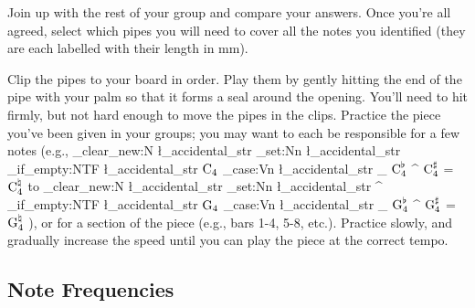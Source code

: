\documentclass{article}
\newcommand{\notename}[3][]{
    \str_clear_new:N \l_accidental_str%
    \str_set:Nn \l_accidental_str {#1}%
    \str_if_empty:NTF \l_accidental_str {
        \ensuremath{\text{#2}\sb{#3}}%
    }{
        \str_case:Vn \l_accidental_str {%
            {_} {\ensuremath{\text{#2}^{\flat}\sb{#3}}}%
            {^} {\ensuremath{\text{#2}^{\sharp}\sb{#3}}}%
            {=} {\ensuremath{\text{#2}^{\natural}\sb{#3}}}%
        }
    }
}
\begin{document}

Join up with the rest of your group and compare your answers. Once you're all agreed, select which pipes you will need to cover all the notes you identified (they are each labelled with their length in \si{\milli\meter}).

Clip the pipes to your board in order. Play them by gently hitting the end of the pipe with your palm so that it forms a seal around the opening. You'll need to hit firmly, but not hard enough to move the pipes in the clips. Practice the piece you've been given in your groups; you may want to each be responsible for a few notes (e.g., \notename{C}{4} to \notename[^]{G}{4}), or for a section of the piece (e.g., bars 1-4, 5-8, etc.). Practice slowly, and gradually increase the speed until you can play the piece at the correct tempo. 

\clearpage

\subsection{Note Frequencies}
\end{document}
